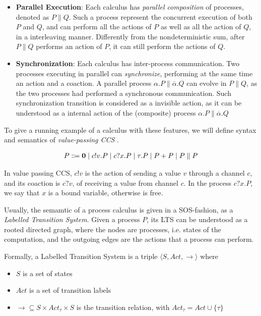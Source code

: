 \begin{itemize}
\item \textbf{Parallel Execution}: Each calculus has \textit{parallel composition} of processes, denoted as $P \parallel Q$. Such a process represent the concurrent execution of both $P$ and $Q$, and can perform all the actions of $P$ as well as all the action of $Q$, in a interleaving manner. Differently from the nondeterministic sum, after $P\parallel Q$ performs an action of $P$, it can still perform the actions of $Q$.
\item \textbf{Synchronization}: Each calculus has inter-process communication. Two processes executing in parallel can \textit{synchronize}, performing at the same time an action and a coaction. A parallel process $\alpha.P \parallel \overline{\alpha}.Q$ can evolve in $P \parallel Q$, as the two processes had performed a synchronous communication. Such synchronization transition is considered as a invisible action, as it can be understood as a internal action of the (composite) process $\alpha.P \parallel \overline{\alpha}.Q$ 

\end{itemize}

To give a running example of a calculus with these features, we will define syntax and semantics of \textit{value-passing CCS} \cite{hennessyTheoryCommunicatingProcesses1993}.

\begin{align*}
  P \Coloneqq \mathbf{0} \mid c!v. P \mid c?x.P \mid \tau.P \mid P + P \mid P \parallel P
\end{align*}	

In value passing CCS, $c!v$ is the action of sending a value $v$ through a channel $c$, and its coaction is $c?v$, of receiving a value from channel $c$. In the process $c?x.P$, we say that $x$ is a bound variable, otherwise is free.

Usually, the semamtic of a process calculus is given in a SOS-fashion, as a \textit{Labelled Transition System}. Given a process $P$, its LTS can be understood as a rooted directed graph, where the nodes are processes, i.e. states of the computation, and the outgoing edges are the actions that a process can perform.

Formally, a Labelled Transition System is a triple $\langle S , Act, \rightarrow \rangle$ where \begin{itemize}
\item $S$ is a set of states
\item $Act$ is a set of transition labels
\item $\rightarrow 	\subseteq S\times Act_\tau \times S$ is the transition relation, with $Act_\tau = Act \cup \{\tau\}$
\end{itemize} 

